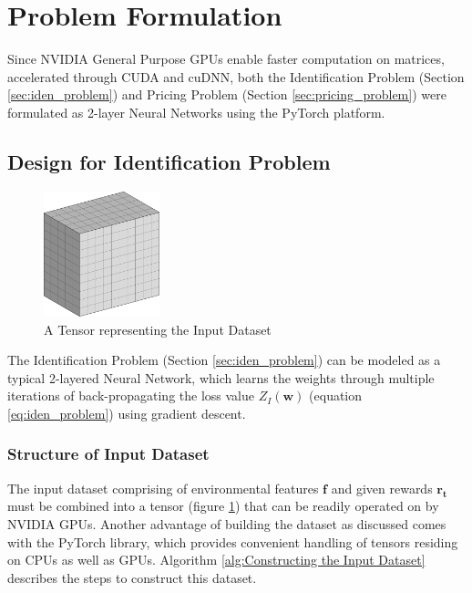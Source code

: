 \documentclass[12pt]{article}
\newcommand{\vect}[1]{\mathbf{#1}}  %
\newcommand{\matr}[1]{\mathbf{#1}}  %
\begin{document}
    \section{Problem Formulation}
    Since NVIDIA General Purpose GPUs enable faster computation on matrices, accelerated through CUDA and cuDNN, both the Identification Problem (Section \ref{sec:iden_problem}) and Pricing Problem (Section \ref{sec:pricing_problem}) were formulated as 2-layer Neural Networks using the PyTorch platform.
    
    \subsection{Design for Identification Problem}
    \begin{figure}
        \centering
        \includegraphics[width=0.3\textwidth]{weights_input_dataset}
        \caption{A Tensor representing the Input Dataset}
        \label{fig:A Tensor representing the Input Dataset}
    \end{figure}
    The Identification Problem (Section \ref{sec:iden_problem}) can be modeled as a typical 2-layered Neural Network, which learns the weights through multiple iterations of back-propagating the loss value $Z_I(\matr{w})$ (equation \ref{eq:iden_problem}) using gradient descent.
    
    \subsubsection{Structure of Input Dataset}
    
    The input dataset comprising of environmental features $\vect{f}$ and given rewards $\vect{r_t}$ must be combined into a tensor (figure \ref{fig:A Tensor representing the Input Dataset}) that can be readily operated on by NVIDIA GPUs. Another advantage of building the dataset as discussed comes with the PyTorch library, which provides convenient handling of tensors residing on CPUs as well as GPUs. Algorithm \ref{alg:Constructing the Input Dataset} describes the steps to construct this dataset.
    
\end{document}
